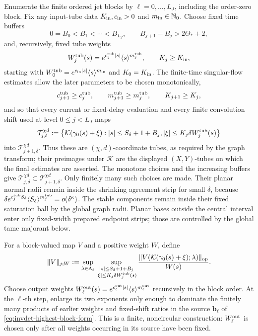 Enumerate the finite ordered jet blocks by
\(\ell=0,\ldots,L_J\), including the order-zero block.  Fix any input-tube
data \(K_{\rm in},c_{\rm in}>0\) and \(m_{\rm in}\in\mathbb N_0\).
Choose fixed time buffers
\begin{equation}
 0=B_0<B_1<\cdots<B_{L_J},\qquad
 B_{j+1}-B_j>2\Theta_*+2,                            \label{eq:invdet-local-buffers}
\end{equation}
and, recursively, fixed tube weights
\[
 W_j^{\rm tub}(s)=e^{c_j^{\rm tub}|s|}
                   \langle s\rangle^{m_j^{\rm tub}},
 \qquad K_j\geq K_{\rm in},
\]
starting with
\(W_0^{\rm tub}=e^{c_{\rm in}|s|}\langle s\rangle^{m_{\rm in}}\)
and \(K_0=K_{\rm in}\).  The finite-time singular-flow estimates allow the
later parameters to be chosen monotonically,
\[
 c_{j+1}^{\rm tub}\geq c_j^{\rm tub},\qquad
 m_{j+1}^{\rm tub}\geq m_j^{\rm tub},\qquad
 K_{j+1}\geq K_j,
\]
and so that every current or fixed-delay evaluation and every finite
convolution shift used at level \(0\leq j<L_J\) maps
\begin{equation}
 \mathcal T^{\chi d}_{j,\delta}
 :=\left\{\mathcal K(\gamma_0(s)+\xi):
       |s|\leq S_\delta+1+B_j,
       |\xi|\leq K_j\delta W_j^{\rm tub}(s)\right\}   \label{eq:invdet-local-tubes}
\end{equation}
into \(\mathcal T^{\chi d}_{j+1,\delta}\).  Thus these are
\((\chi,d)\)-coordinate tubes, as required by the graph transform; their
preimages under \(\mathcal K\) are the displayed \((X,Y)\)-tubes on which
the final estimates are asserted.  The monotone choices and the increasing
buffers give
\(\mathcal T^{\chi d}_{j,\delta}\subset
  \mathcal T^{\chi d}_{j+1,\delta}\).
Only finitely many such choices are made.  Their planar normal radii remain
inside the shrinking agreement
strip for small \(\delta\), because
\(\delta e^{c_j^{\rm tub}S_\delta}
\langle S_\delta\rangle^{m_j^{\rm tub}}=o(\delta^\kappa)\).
The stable components remain inside their fixed saturation ball by the
global graph radii.  Planar bases outside the central interval enter only
fixed-width prepared endpoint strips; those are controlled by the global
tame majorant below.

For a block-valued map \(V\) and a positive weight \(W\), define
\begin{equation}
 \|V\|_{j;W}
 :=\sup_{\lambda\in\Lambda_\delta}
   \sup_{\substack{|s|\leq S_\delta+1+B_j\\
                   |\xi|\leq K_j\delta W_j^{\rm tub}(s)}}
       \frac{\|V(\mathcal K(\gamma_0(s)+\xi);\lambda)\|_{\rm op}}{W(s)}.
                                                               \label{eq:invdet-local-weighted-norm}
\end{equation}
Choose output weights
\(W_\ell^{\rm out}(s)=e^{c_\ell^{\rm out}|s|}
\langle s\rangle^{m_\ell^{\rm out}}\) recursively in the block order.
At the \(\ell\)-th step, enlarge its two exponents only enough to dominate
the finitely many products of earlier weights and fixed-shift ratios in the
source \(\mathbf b_\ell\) of
\cref{eq:invdet-highest-block-form}.  This is a finite, noncircular
construction: \(W_\ell^{\rm out}\) is chosen only after all weights occurring
in its source have been fixed.

